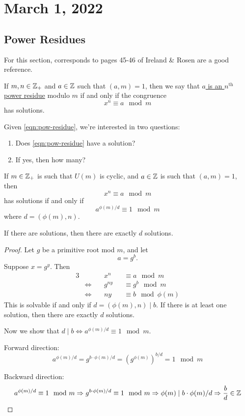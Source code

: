 \section{March 1, 2022}
\subsection{Power Residues}
For this section, corresponds to pages 45-46 of Ireland \& Rosen \cite{ireland1990classical} are a good reference.
\begin{definition}
    If $m, n\in \mathbb Z_+$ and $a\in \mathbb Z$ such that $(a, m) = 1$, then we say that \ul{$a$ is an $n^\mathrm{th}$ power residue} modulo $m$ if and only if the congruence
    \begin{equation}\label{eqn:pow-residue}x^n\equiv a\mod m\end{equation}
    has solutions.
\end{definition}
Given \cref{eqn:pow-residue}, we're interested in two questions:
\begin{enumerate}[1)]
    \item Does \cref{eqn:pow-residue} have a solution?
    \item If yes, then how many?
\end{enumerate}

\begin{proposition}\label{prop:4.2.1}
    If $m\in\mathbb Z_+$ is such that $U(m)$ is cyclic, and $a\in\mathbb Z$ is such that $(a, m)=1$, then
    \[x^n\equiv a\mod m\]
    has solutions if and only if
    \[a^{\phi(m)/d}\equiv 1\mod m\]
    where $d = (\phi(m), n)$.

    If there are solutions, then there are exactly $d$ solutions.
\end{proposition}
\begin{proof}
    Let $g$ be a primitive root mod $m$, and let
    \[a=g^b.\]
    Suppose $x = g^y$. Then
    \begin{alignat*}{3}
         &        &  & x^n    &  & \equiv a\mod m       \\
         & \iff\  &  & g^{ny} &  & \equiv g^b\mod m     \\
         & \iff   &  & ny     &  & \equiv b\mod \phi(m)
    \end{alignat*}
    This is solvable if and only if $d=(\phi(m), n)\mid b$. If there is at least one solution, then there are exactly $d$ solutions.

    Now we show that $d\mid b\Leftrightarrow a^{\phi(m)/d}\equiv 1\mod m$.

    Forward direction:
    \[a^{\phi(m)/d} = g^{b\cdot \phi(m)/d} = \left(g^{\phi(m)}\right)^{b/d} = 1\mod m\]

    Backward direction:
    \[a^{\phi(m)/d}\equiv 1\mod m \Rightarrow g^{b\cdot \phi(m)/d}\equiv 1\mod m \Rightarrow \phi(m)\mid b\cdot \phi(m)/d \Rightarrow \frac{b}{d}\in\mathbb Z\]
\end{proof}

